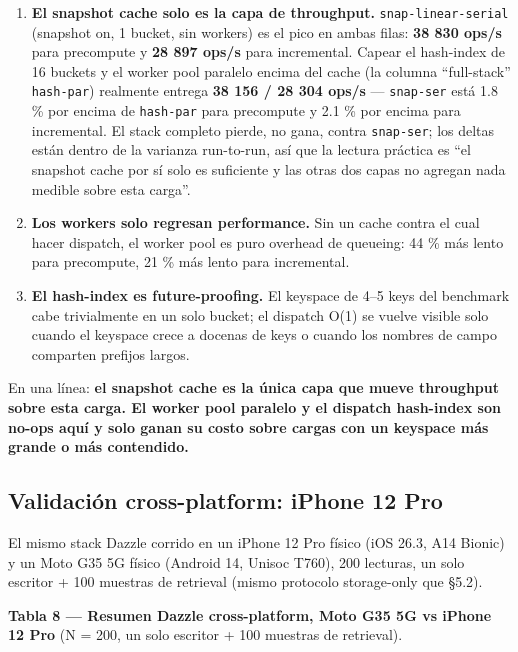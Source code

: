 \begin{enumerate}
\def\labelenumi{\arabic{enumi}.}
\tightlist
\item
  \textbf{El snapshot cache solo es la capa de throughput.}
  \texttt{snap-linear-serial} (snapshot on, 1 bucket, sin workers) es el pico en
  ambas filas: \textbf{38 830 ops/s} para precompute y \textbf{28 897 ops/s}
  para incremental. Capear el hash-index de 16 buckets y el worker pool paralelo
  encima del cache (la columna ``full-stack'' \texttt{hash-par}) realmente
  entrega \textbf{38 156 / 28 304 ops/s} --- \texttt{snap-ser} está 1.8 \% por
  encima de \texttt{hash-par} para precompute y 2.1 \% por encima para
  incremental. El stack completo pierde, no gana, contra \texttt{snap-ser}; los
  deltas están dentro de la varianza run-to-run, así que la lectura práctica es
  ``el snapshot cache por sí solo es suficiente y las otras dos capas no agregan
  nada medible sobre esta carga''.
\item
  \textbf{Los workers solo regresan performance.} Sin un cache contra el cual
  hacer dispatch, el worker pool es puro overhead de queueing: 44 \% más lento
  para precompute, 21 \% más lento para incremental.
\item
  \textbf{El hash-index es future-proofing.} El keyspace de 4--5 keys del
  benchmark cabe trivialmente en un solo bucket; el dispatch O(1) se vuelve
  visible solo cuando el keyspace crece a docenas de keys o cuando los nombres
  de campo comparten prefijos largos.
\end{enumerate}

En una línea: \textbf{el snapshot cache es la única capa que mueve throughput
sobre esta carga. El worker pool paralelo y el dispatch hash-index son no-ops
aquí y solo ganan su costo sobre cargas con un keyspace más grande o más
contendido.}

\subsection{Validación cross-platform: iPhone 12
Pro}\label{validaciuxf3n-cross-platform-iphone-12-pro}

El mismo stack Dazzle corrido en un iPhone 12 Pro físico (iOS 26.3, A14 Bionic)
y un Moto G35 5G físico (Android 14, Unisoc T760), 200 lecturas, un solo
escritor + 100 muestras de retrieval (mismo protocolo storage-only que §5.2).

\textbf{Tabla 8 --- Resumen Dazzle cross-platform, Moto G35 5G vs iPhone 12 Pro}
(N = 200, un solo escritor + 100 muestras de retrieval).

